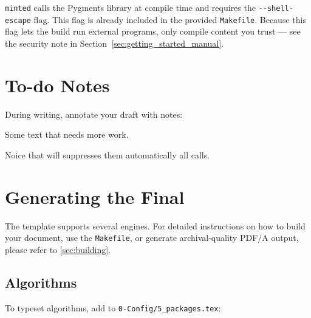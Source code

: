 \begin{warningbox}[title={Requirement: \texttt{-\/-shell-escape}}]
  \texttt{minted} calls the Pygments library at compile time and requires the \texttt{-{}-shell-escape} flag.
  This flag is already included in the provided \texttt{Makefile}.
  Because this flag lets the build run external programs, only compile content you trust —
  see the security note in Section~\ref{sec:getting_started_manual}.
\end{warningbox}


\section{To-do Notes}
\label{sec:todonotes}

During writing, annotate your draft with \latexinline{\todo} notes:
\begin{latexcode}
Some text that needs more work.
\end{latexcode}

Noice that  will suppresses them automatically all \latexinline{\todo} calls.


\section{Generating the Final }
\label{sec:generating_pdfs}

The \novathesis{} template supports several  engines. For detailed instructions on how to build your document, use the \texttt{Makefile}, or generate archival-quality \gls{PDF}/A output, please refer to \autoref{sec:building}.


\subsection{Algorithms}
\label{sub:algorithms}

To typeset algorithms, add to \texttt{0-Config/5\_packages.tex}:
\begin{latexcode}
\usepackage{algorithm2e}
\end{latexcode}

